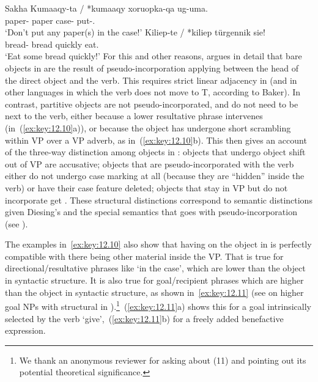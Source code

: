 \documentclass[output=paper]{langsci/langscibook}
\begin{document}
\ea\label{ex:key:12.10}Sakha
	\ea
		\gll    Kumaaqy-ta / *kumaaqy  xoruopka-qa ug-uma.\\
                paper-\Part{} {} \hphantom{*}paper  case-\Dat{}  put-\Neg.\Imp{}\\
		\glt    ‘Don’t put any paper(s) in the case!’
	\ex
		\gll    Kiliep-te / *kiliep  türgennik sie!\\
                bread-\Part{} {} \hphantom{*}bread  quickly  eat.\Imp{}\\
		\glt    ‘Eat some bread quickly!’
	\z
\z
For this and other reasons, \citet{Baker2014} argues in detail that bare
objects in  are the result of pseudo-incorporation applying between the
head of the direct object and the verb. This requires strict linear adjacency
in  (and in other languages in which the verb does not move to T,
according to Baker).  In contrast, partitive objects are not
pseudo-incorporated, and do not need to be next to the verb, either because a
lower resultative phrase intervenes (in~(\ref{ex:key:12.10}a)), or because the object has
undergone short scrambling within VP over a VP adverb, as in~(\ref{ex:key:12.10}b).  This then
gives an account of the three-way distinction among objects in : objects
that undergo object shift out of VP are accusative; objects that are
pseudo-incorporated with the verb either do not undergo case marking at all
(because they are “hidden” inside the verb) or have their case feature deleted;
objects that stay in VP but do not incorporate get .  These
structural distinctions correspond to semantic distinctions given Diesing’s
 and the special semantics that goes with
pseudo-incorporation (see \citealt{Dayal2011}).

The examples in~\eqref{ex:key:12.10} also show that having 
on the object in  is perfectly compatible with there being other material
inside the VP.  That is true for directional/resultative phrases like ‘in the
case’, which are lower than the object in syntactic structure. It is also true
for goal/recipient phrases which are higher than the object in syntactic
structure, as shown in~\eqref{ex:key:12.11} (see \citealt{BakVin2010} on higher
goal NPs with structural  in ).\footnote{We thank an
anonymous reviewer for asking about (11) and pointing out its potential
theoretical significance.}~(\ref{ex:key:12.11}a) shows this for a goal
intrinsically selected by the verb ‘give’,~(\ref{ex:key:12.11}b) for a freely
added benefactive expression.
\end{document}
